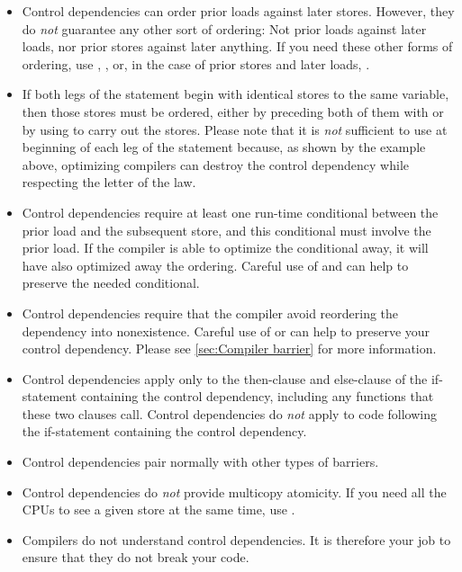 \begin{itemize}
 \item
      Control dependencies can order prior loads against later stores.
      However, they do \emph{not} guarantee any other sort of ordering:
      Not prior loads against later loads, nor prior stores against
      later anything.
      If you need these other forms of ordering, use ,
      , or, in the case of prior stores and later loads,
      .

 \item
      If both legs of the  statement begin with identical stores to
      the same variable, then those stores must be ordered, either by
      preceding both of them with  or by using
       to carry out the stores.
      Please note that it is \emph{not} sufficient to use 
      at beginning of each leg of the  statement because, as shown by
      the example above, optimizing compilers can destroy the control
      dependency while respecting the letter of the  law.

 \item
      Control dependencies require at least one run-time conditional
      between the prior load and the subsequent store, and this
      conditional must involve the prior load.
      If the compiler is able to optimize the conditional away, it will
      have also optimized away the ordering.
      Careful use of  and  can help to
      preserve the needed conditional.

 \item
      Control dependencies require that the compiler avoid reordering the
      dependency into nonexistence.
      Careful use of  or  can help
      to preserve your control dependency.
      Please see \cref{sec:Compiler barrier} for more information.

 \item
      Control dependencies apply only to the then-clause and else-clause
      of the if-statement containing the control dependency, including
      any functions that these two clauses call.
      Control dependencies do \emph{not} apply to code following the
      if-statement containing the control dependency.

 \item
      Control dependencies pair normally with other types of barriers.

 \item
      Control dependencies do \emph{not} provide multicopy atomicity.
      If you need all the CPUs to see a given store at the same time,
      use .

 \item
      Compilers do not understand control dependencies.
      It is therefore your job to ensure that they do not break your code.
\end{itemize}

